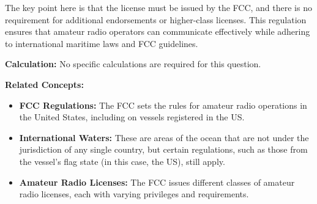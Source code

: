 The key point here is that the license must be issued by the FCC, and there is no requirement for additional endorsements or higher-class licenses. This regulation ensures that amateur radio operators can communicate effectively while adhering to international maritime laws and FCC guidelines.

\noindent\textbf{Calculation:} No specific calculations are required for this question.

\noindent\textbf{Related Concepts:}
\begin{itemize}
    \item \textbf{FCC Regulations:} The FCC sets the rules for amateur radio operations in the United States, including on vessels registered in the US.
    \item \textbf{International Waters:} These are areas of the ocean that are not under the jurisdiction of any single country, but certain regulations, such as those from the vessel's flag state (in this case, the US), still apply.
    \item \textbf{Amateur Radio Licenses:} The FCC issues different classes of amateur radio licenses, each with varying privileges and requirements.
\end{itemize}

